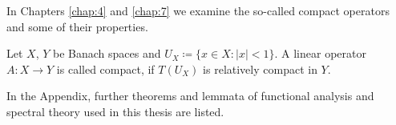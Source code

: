 In Chapters \ref{chap:4} and \ref{chap:7} we examine the so-called compact operators and some of their properties.

\begin{definition}
	Let $X$, $Y$ be Banach spaces and $U_{X} \coloneqq \{ x \in X \colon |x| < 1 \}$. A linear operator $A \colon X \rightarrow Y$ is called compact, if $T(U_{X})$ is relatively compact in $Y$.
\end{definition}

In the Appendix, further theorems and lemmata of functional analysis and spectral theory used in this thesis are listed.